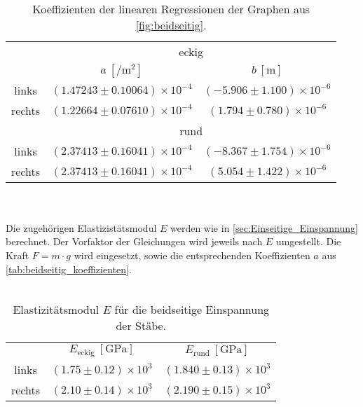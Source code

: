\\
\begin{table}[h!]
    \centering
    \caption{Koeffizienten der linearen Regressionen der Graphen aus \autoref{fig:beidseitig}.}
    \label{tab:beidseitig_koeffizienten}
    \begin{tabular}{c|c c|}
        \toprule
        & \multicolumn{2}{c}{eckig}\\
        \cmidrule(lr){2-3}
        & $a \:[\unit{\per\meter\squared}]$ & $b \:[\unit{\meter}]$\\%
        \midrule
        links & $(1.47243 \pm 0.10064)\times 10^{-4}$ & $(-5.906 \pm 1.100)\times 10^{-6}$\\%
        rechts & $(1.22664 \pm 0.07610)\times 10^{-4}$ & $(1.794 \pm 0.780)\times 10^{-6}$\\%
        \midrule
        &\multicolumn{2}{c}{rund}\\ 
        \cmidrule(lr){2-3}
        links & $(2.37413 \pm 0.16041)\times 10^{-4}$ & $(-8.367 \pm 1.754)\times 10^{-6}$ \\
        rechts & $(2.37413 \pm 0.16041)\times 10^{-4}$ & $(5.054 \pm 1.422)\times 10^{-6}$ \\
        \bottomrule
    \end{tabular}
\end{table}
\\
\\
Die zugehörigen Elastizistätsmodul $E$ werden wie in \autoref{sec:Einseitige_Einspannung} berechnet. Der Vorfaktor der Gleichungen %
wird jeweils nach $E$ umgestellt. Die Kraft $F = m \cdot g$ wird eingesetzt, sowie die entsprechenden Koeffizienten $a$ aus \autoref{tab:beidseitig_koeffizienten}.\\
\\
\begin{table}
    \centering
    \caption{Elastizitätsmodul $E$ für die beidseitige Einspannung der Stäbe.}
    \label{tab:beidseitig_E}
    \begin{tabular}{c|c c|}
        \toprule
        & $E_{\text{eckig}}\:[\unit{\giga\pascal}]$ & $E_{\text{rund}}\:[\unit{\giga\pascal}]$\\
        \cmidrule(lr){2-3}
        links & $(1.75 \pm 0.12)\times 10^3$ & $(1.840 \pm 0.13)\times 10^3$\\
        rechts & $(2.10 \pm 0.14)\times 10^3$ & $(2.190 \pm 0.15)\times 10^3$\\
        \bottomrule
    \end{tabular}
\end{table}
